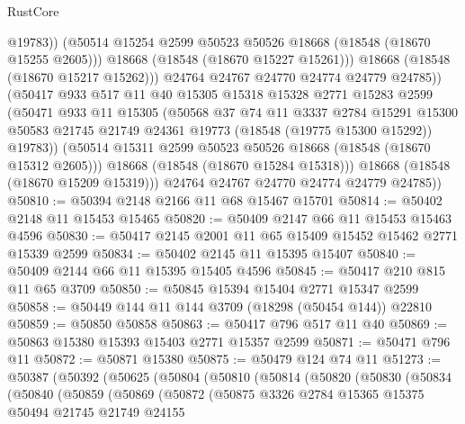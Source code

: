 \begin{lexlean}{RustCore}
\begin{coremodule}
                      @19783))
                  (@50514 @15254 @2599 @50523 @50526 @18668 (@18548 (@18670 @15255 @2605)))
                  @18668
                  (@18548 (@18670 @15227 @15261)))
                @18668
                (@18548 (@18670 @15217 @15262)))
              @24764
              @24767
              @24770
              @24774
              @24779
              @24785))
          (@50417
            @933
            @517
            @11
            @40
            @15305
            @15318
            @15328
            @2771
            @15283
            @2599
            (@50471
              @933
              @11
              @15305
              (@50568
                @37
                @74
                @11
                @3337
                @2784
                @15291
                @15300
                @50583
                @21745
                @21749
                @24361
                @19773
                (@18548 (@19775 @15300 @15292))
                @19783))
            (@50514 @15311 @2599 @50523 @50526 @18668 (@18548 (@18670 @15312 @2605)))
            @18668
            (@18548 (@18670 @15284 @15318)))
          @18668
          (@18548 (@18670 @15209 @15319)))
        @24764
        @24767
        @24770
        @24774
        @24779
        @24785))
@50810 := @50394 @2148 @2166 @11 @68 @15467 @15701
@50814 := @50402 @2148 @11 @15453 @15465
@50820 := @50409 @2147 @66 @11 @15453 @15463 @4596
@50830 := @50417 @2145 @2001 @11 @65 @15409 @15452 @15462 @2771 @15339 @2599
@50834 := @50402 @2145 @11 @15395 @15407
@50840 := @50409 @2144 @66 @11 @15395 @15405 @4596
@50845 := @50417 @210 @815 @11 @65 @3709
@50850 := @50845 @15394 @15404 @2771 @15347 @2599
@50858 := @50449 @144 @11 @144 @3709 (@18298 (@50454 @144)) @22810
@50859 := @50850 @50858
@50863 := @50417 @796 @517 @11 @40
@50869 := @50863 @15380 @15393 @15403 @2771 @15357 @2599
@50871 := @50471 @796 @11
@50872 := @50871 @15380
@50875 := @50479 @124 @74 @11
@51273 := @50387
    (@50392
      (@50625
        (@50804
          (@50810
            (@50814
              (@50820
                (@50830
                  (@50834
                    (@50840
                      (@50859
                        (@50869
                          (@50872
                            (@50875
                              @3326
                              @2784
                              @15365
                              @15375
                              @50494
                              @21745
                              @21749
                              @24155

\end{coremodule}
\end{lexlean}
